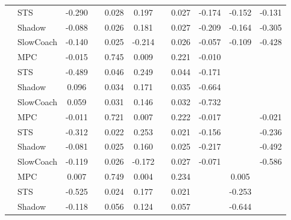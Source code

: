 \begin{tabular}{|l|l|*{9}{c|}}
                                                           & STS &   -0.290 &        &     0.028 &  0.197 &     &  0.027 &  -0.174 &  -0.152 &   -0.131 \\
                                                           & Shadow &   -0.088 &        &     0.026 &  0.181 &     &  0.027 &  -0.209 &  -0.164 &   -0.305 \\
                                                           & SlowCoach &   -0.140 &        &     0.025 & -0.214 &     &  0.026 &  -0.057 &  -0.109 &   -0.428 \\
\midrule
[True, False, True, True, False, True, True, False, False] & MPC &   -0.015 &        &     0.745 &  0.009 &     &  0.221 &  -0.010 &      &       \\
                                                           & STS &   -0.489 &        &     0.046 &  0.249 &     &  0.044 &  -0.171 &      &       \\
                                                           & Shadow &    0.096 &        &     0.034 &  0.171 &     &  0.035 &  -0.664 &      &       \\
                                                           & SlowCoach &    0.059 &        &     0.031 &  0.146 &     &  0.032 &  -0.732 &      &       \\
\midrule
[True, False, True, True, False, True, True, False, True] & MPC &   -0.011 &        &     0.721 &  0.007 &     &  0.222 &  -0.017 &      &   -0.021 \\
                                                           & STS &   -0.312 &        &     0.022 &  0.253 &     &  0.021 &  -0.156 &      &   -0.236 \\
                                                           & Shadow &   -0.081 &        &     0.025 &  0.160 &     &  0.025 &  -0.217 &      &   -0.492 \\
                                                           & SlowCoach &   -0.119 &        &     0.026 & -0.172 &     &  0.027 &  -0.071 &      &   -0.586 \\
\midrule
[True, False, True, True, False, True, False, True, False] & MPC &    0.007 &        &     0.749 &  0.004 &     &  0.234 &      &   0.005 &       \\
                                                           & STS &   -0.525 &        &     0.024 &  0.177 &     &  0.021 &      &  -0.253 &       \\
                                                           & Shadow &   -0.118 &        &     0.056 &  0.124 &     &  0.057 &      &  -0.644 &       \\

\end{tabular}

